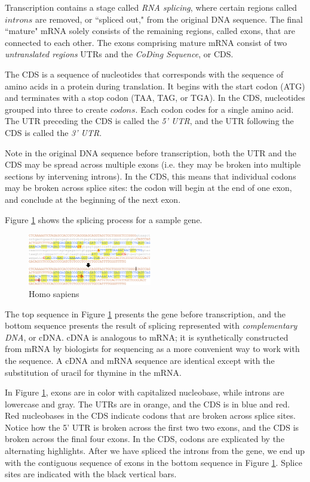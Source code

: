 \documentclass[letterpaper]{article}
\begin{document}
Transcription contains a stage called \textit{RNA splicing}, where certain regions called $introns$ are removed, or ``spliced out," from the original DNA sequence. The final ``mature" mRNA solely consists of the remaining regions, called exons, that are connected to each other. The exons comprising mature mRNA consist of two \textit{untranslated regions} UTRs and the \textit{CoDing Sequence}, or CDS. 

The CDS is a sequence of nucleotides that corresponds with the sequence of amino acids in a protein during translation. It begins with the start codon (ATG) and terminates with a stop codon (TAA, TAG, or TGA). In the CDS, nucleotides grouped into three to create $codons$. Each codon codes for a single amino acid. The UTR preceding the CDS is called the \textit{5' UTR}, and the UTR following the CDS is called the \textit{3' UTR}.

Note in the original DNA sequence before transcription, both the UTR and the CDS may be spread across multiple exons (i.e. they may be broken into multiple sections by intervening introns). In the CDS, this means that individual codons may be broken across splice sites: the codon will begin at the end of one exon, and conclude at the beginning of the next exon.

Figure \ref{fig:gene} shows the splicing process for a sample gene. 

\begin{figure}[h!]
\centering
\includegraphics[width=0.48\textwidth]{images/gene.png}
  \caption{Homo sapiens}\label{fig:gene}
  \vspace{-3mm}
\end{figure}

The top sequence in Figure \ref{fig:gene} presents the gene before transcription, and the bottom sequence presents the result of splicing represented with \textit{complementary DNA}, or cDNA. cDNA is analogous to mRNA; it is synthetically constructed from mRNA by biologists for sequencing as a more convenient way to work with the sequence. A cDNA and mRNA sequence are identical except with the substitution of uracil for thymine in the mRNA.

In Figure \ref{fig:gene}, exons are in color with capitalized nucleobase, while introns are lowercase and gray. The UTRs are in orange, and the CDS is in blue and red. Red nucleobases in the CDS indicate codons that are broken across splice sites. Notice how the 5' UTR is broken across the first two two exons, and the CDS is broken across the final four exons. In the CDS, codons are explicated by the alternating highlights. After we have spliced the introns from the gene, we end up with the contiguous sequence of exons in the bottom sequence in Figure \ref{fig:gene}. Splice sites are indicated with the black vertical bars.
\end{document}

